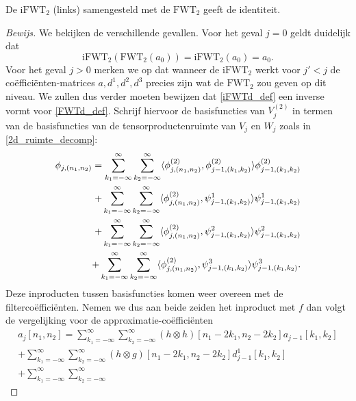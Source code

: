 \begin{stelling}
  De $\mathrm{iFWT}_2$ (links) samengesteld met de $\mathrm{FWT}_2$ geeft de identiteit.
\end{stelling}
\begin{proof}[Bewijs]
  We bekijken de verschillende gevallen. Voor het geval $j=0$ geldt duidelijk dat
  \[
  \mathrm{iFWT}_2(\mathrm{FWT}_2(a_0)) = \mathrm{iFWT}_2(a_0) = a_0.
  \]
  Voor het geval $j>0$ merken we op dat wanneer de $\mathrm{iFWT}_2$ werkt voor $j'<j$ de co\"effici\"enten-matrices
  $a,d^1,d^2,d^3$ precies zijn wat de $\mathrm{FWT}_2$ zou geven op dit niveau. 
  We zullen dus verder moeten bewijzen dat \eqref{iFWTd_def} een inverse vormt voor
  \eqref{FWTd_def}.
  Schrijf hiervoor de basisfuncties van $V^{(2)}_j$ in termen van de basisfuncties van
  de tensorproductenruimte van $V_j$ en $W_j$ zoals in \eqref{2d_ruimte_decomp}:
  \begin{equation*}
    \begin{split}
      \phi_{j,(n_1,n_2)} = 
      \sum_{k_1=-\infty}^\infty\sum_{k_2=-\infty}^\infty 
      \langle \phi^{(2)}_{j,(n_1,n_2)} , \phi^{(2)}_{j-1,(k_1,k_2)} \rangle \phi^{(2)}_{j-1,(k_1,k_2)} \\
      + \sum_{k_1=-\infty}^\infty\sum_{k_2=-\infty}^\infty 
      \langle \phi^{(2)}_{j,(n_1,n_2)} , \psi^1_{j-1,(k_1,k_2)} \rangle \psi^1_{j-1,(k_1,k_2)} \\
      + \sum_{k_1=-\infty}^\infty\sum_{k_2=-\infty}^\infty 
      \langle \phi^{(2)}_{j,(n_1,n_2)} , \psi^2_{j-1,(k_1,k_2)} \rangle \psi^2_{j-1,(k_1,k_2)} \\
      + \sum_{k_1=-\infty}^\infty\sum_{k_2=-\infty}^\infty 
      \langle \phi^{(2)}_{j,(n_1,n_2)} , \psi^3_{j-1,(k_1,k_2)} \rangle \psi^3_{j-1,(k_1,k_2)}.
      \end{split}
  \end{equation*}
  Deze inproducten tussen basisfuncties komen weer overeen met de filterco\"effici\"enten. Nemen we dus aan
  beide zeiden het inproduct met $f$ dan volgt de vergelijking voor de approximatie-co\"effici\"enten
  \begin{equation*}
    \begin{split}
      a_{j}[n_1,n_2] = 
      \sum_{k_1=-\infty}^\infty\sum_{k_2=-\infty}^\infty 
      (h\otimes h)[n_1-2k_1,n_2-2k_2] a_{j-1}[k_1,k_2] \\
      + \sum_{k_1=-\infty}^\infty\sum_{k_2=-\infty}^\infty 
      (h\otimes g)[n_1-2k_1,n_2-2k_2] d^1_{j-1}[k_1,k_2] \\
      + \sum_{k_1=-\infty}^\infty\sum_{k_2=-\infty}^\infty 

\end{split}
\end{equation*}
\end{proof}
